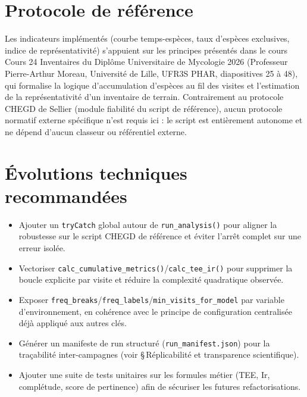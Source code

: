 \documentclass[11pt,a4paper]{article}
\begin{document}
\section{Protocole de référence}
Les indicateurs implémentés (courbe temps-espèces, taux d'espèces exclusives, indice de
représentativité) s'appuient sur les principes présentés dans le cours \og{}Cours 24
Inventaires\fg{} du Diplôme Universitaire de Mycologie 2026 (Professeur Pierre-Arthur
Moreau, Université de Lille, UFR3S PHAR, diapositives 25 à 48), qui formalise la logique
d'accumulation d'espèces au fil des visites et l'estimation de la représentativité
d'un inventaire de terrain. Contrairement au protocole CHEGD de Sellier (module fiabilité
du script de référence), aucun protocole normatif externe spécifique n'est requis ici : le
script est entièrement autonome et ne dépend d'aucun classeur ou référentiel externe.

\section{Évolutions techniques recommandées}
\begin{itemize}[leftmargin=1.2cm]
  \item Ajouter un \texttt{tryCatch} global autour de \texttt{run\_analysis()} pour aligner la robustesse sur le script CHEGD de référence et éviter l'arrêt complet sur une erreur isolée.
  \item Vectoriser \texttt{calc\_cumulative\_metrics()}/\texttt{calc\_tee\_ir()} pour supprimer la boucle explicite par visite et réduire la complexité quadratique observée.
  \item Exposer \texttt{freq\_breaks}/\texttt{freq\_labels}/\texttt{min\_visits\_for\_model} par variable d'environnement, en cohérence avec le principe de configuration centralisée déjà appliqué aux autres clés.
  \item Générer un manifeste de run structuré (\texttt{run\_manifest.json}) pour la traçabilité inter-campagnes (voir \S\,Réplicabilité et transparence scientifique).
  \item Ajouter une suite de tests unitaires sur les formules métier (TEE, Ir, complétude, score de pertinence) afin de sécuriser les futures refactorisations.
\end{itemize}
\end{document}
